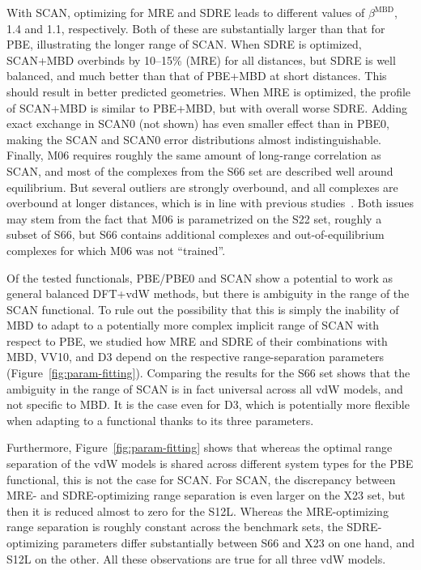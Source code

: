 With SCAN, optimizing for MRE and SDRE leads to different values of $\beta^\text{MBD}$, 1.4 and 1.1, respectively.
Both of these are substantially larger than that for PBE, illustrating the longer range of SCAN\@.
When SDRE is optimized, SCAN+MBD overbinds by 10--15\% (MRE) for all distances, but SDRE is well balanced, and much better than that of PBE+MBD at short distances.
This should result in better predicted geometries.
When MRE is optimized, the profile of SCAN+MBD is similar to PBE+MBD, but with overall worse SDRE\@.
Adding exact exchange in SCAN0 (not shown) has even smaller effect than in PBE0, making the SCAN and SCAN0 error distributions almost indistinguishable.
Finally, M06 requires roughly the same amount of long-range correlation as SCAN, and most of the complexes from the S66 set are described well around equilibrium.
But several outliers are strongly overbound, and all complexes are overbound at longer distances, which is in line with previous studies~\cite{GoerigkJPCL15}.
Both issues may stem from the fact that M06 is parametrized on the S22 set, roughly a subset of S66, but S66 contains additional complexes and out-of-equilibrium complexes for which M06 was not ``trained''.

Of the tested functionals, PBE/PBE0 and SCAN show a potential to work as general balanced DFT+vdW methods, but there is ambiguity in the range of the SCAN functional.
To rule out the possibility that this is simply the inability of MBD to adapt to a potentially more complex implicit range of SCAN with respect to PBE, we studied how MRE and SDRE of their combinations with MBD, VV10, and D3 depend on the respective range-separation parameters (Figure~\ref{fig:param-fitting}).
Comparing the results for the S66 set shows that the ambiguity in the range of SCAN is in fact universal across all vdW models, and not specific to MBD\@.
It is the case even for D3, which is potentially more flexible when adapting to a functional thanks to its three parameters.

Furthermore, Figure~\ref{fig:param-fitting} shows that whereas the optimal range separation of the vdW models is shared across different system types for the PBE functional, this is not the case for SCAN\@.
For SCAN, the discrepancy between MRE- and SDRE-optimizing range separation is even larger on the X23 set, but then it is reduced almost to zero for the S12L.
Whereas the MRE-optimizing range separation is roughly constant across the benchmark sets, the SDRE-optimizing parameters differ substantially between S66 and X23 on one hand, and S12L on the other.
All these observations are true for all three vdW models.

